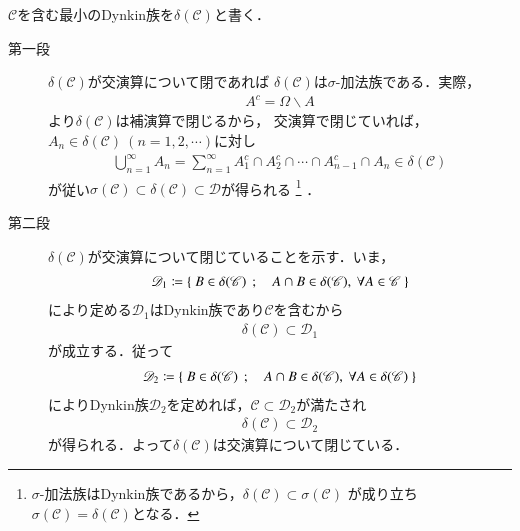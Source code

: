 \begin{prf}$\mathscr{C}$を含む最小のDynkin族を$\delta(\mathscr{C})$と書く．
	\begin{description}
		\item[第一段]
			$\delta(\mathscr{C})$が交演算について閉であれば
			$\delta(\mathscr{C})$は$\sigma$-加法族である．実際，
			\begin{align}
				A^c = \Omega \backslash A
			\end{align}
			より$\delta(\mathscr{C})$は補演算で閉じるから，
			交演算で閉じていれば，
			$A_n \in \delta(\mathscr{C})\ (n=1,2,\cdots)$に対し
			\begin{align}
				\bigcup_{n=1}^{\infty} A_n
				= \sum_{n=1}^{\infty} A_1^c \cap A_2^c \cap \cdots \cap A_{n-1}^c \cap A_n
				\in \delta(\mathscr{C})
			\end{align}
			が従い$\sigma(\mathscr{C}) \subset \delta(\mathscr{C}) \subset \mathscr{D}$が得られる
			\footnote{
				$\sigma$-加法族はDynkin族であるから，$\delta(\mathscr{C}) \subset \sigma(\mathscr{C})$
				が成り立ち$\sigma(\mathscr{C}) = \delta(\mathscr{C})$となる．
			}
			．
			
		\item[第二段]
			$\delta(\mathscr{C})$が交演算について閉じていることを示す．いま，
			\begin{align}
				\mathscr{D}_1 \coloneqq
				\Set{B \in \delta(\mathscr{C})}{ A \cap B \in \delta(\mathscr{C}),\ 
				\forall A \in \mathscr{C}}
			\end{align}
			により定める$\mathscr{D}_1$はDynkin族であり$\mathscr{C}$を含むから
			\begin{align}
				\delta(\mathscr{C}) \subset \mathscr{D}_1
			\end{align}
			が成立する．従って
			\begin{align}
				\mathscr{D}_2 \coloneqq
				\Set{B \in \delta(\mathscr{C})}{ A \cap B \in \delta(\mathscr{C}),\ 
				\forall A \in \delta(\mathscr{C})}
			\end{align}
			によりDynkin族$\mathscr{D}_2$を定めれば，$\mathscr{C} \subset \mathscr{D}_2$が満たされ
			\begin{align}
				\delta(\mathscr{C}) \subset \mathscr{D}_2
			\end{align}
			が得られる．よって$\delta(\mathscr{C})$は交演算について閉じている．
			\QED
	\end{description}
\end{prf}

